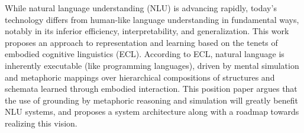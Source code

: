 While natural language understanding (NLU) is advancing rapidly, today's technology differs from human-like language understanding in fundamental ways, notably in its inferior efficiency, interpretability, and generalization. This work proposes an approach to representation and learning based on the tenets of embodied cognitive linguistics (ECL). According to ECL, natural language is inherently executable (like programming languages), driven by mental simulation and metaphoric mappings over hierarchical compositions of structures and schemata learned through embodied interaction. This position paper argues that the use of grounding by metaphoric reasoning and simulation will greatly benefit NLU systems,  and proposes a system architecture along with a roadmap towards realizing this vision.
